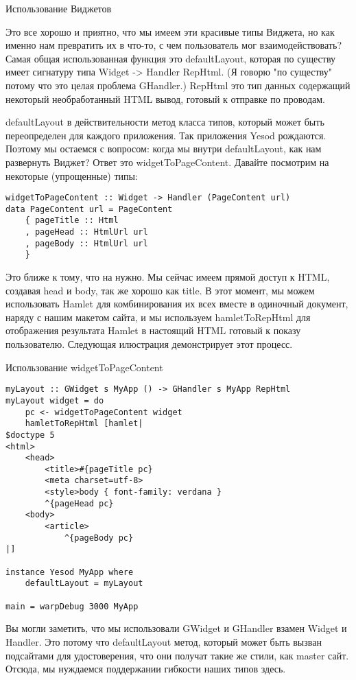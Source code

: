 Использование Виджетов

Это все хорошо и приятно, что мы имеем эти красивые типы Виджета, но как именно нам превратить их в что-то, с чем пользователь мог взаимодействовать? Самая общая использованная функция это defaultLayout, которая по существу имеет сигнатуру типа Widget -> Handler RepHtml. (Я говорю "по существу" потому что это целая проблема GHandler.) RepHtml это тип данных содержащий некоторый необработанный HTML вывод, готовый к отправке по проводам.

defaultLayout в действительности метод класса типов, который может быть переопределен для каждого приложения. Так приложения Yesod рождаются. Поэтому мы остаемся с вопросом: когда мы внутри defaultLayout, как нам развернуть Виджет? Ответ это widgetToPageContent. Давайте посмотрим на некоторые (упрощенные) типы: 

\begin{lstlisting}
widgetToPageContent :: Widget -> Handler (PageContent url)
data PageContent url = PageContent
    { pageTitle :: Html
    , pageHead :: HtmlUrl url
    , pageBody :: HtmlUrl url
    }
\end{lstlisting} 

Это ближе к тому, что на нужно. Мы сейчас имеем прямой доступ к HTML, создавая head и body, так же хорошо как title. В этот момент, мы можем использовать Hamlet для комбинирования их всех вместе в одиночный документ, наряду с нашим макетом сайта, и мы используем hamletToRepHtml для отображения результата Hamlet в настоящий HTML готовый к показу пользователю. Следующая илюстрация демонстрирует этот процесс.

Использование widgetToPageContent

\begin{lstlisting}
myLayout :: GWidget s MyApp () -> GHandler s MyApp RepHtml
myLayout widget = do
    pc <- widgetToPageContent widget
    hamletToRepHtml [hamlet|
$doctype 5
<html>
    <head>
        <title>#{pageTitle pc}
        <meta charset=utf-8>
        <style>body { font-family: verdana }
        ^{pageHead pc}
    <body>
        <article>
            ^{pageBody pc}
|]

instance Yesod MyApp where
    defaultLayout = myLayout

main = warpDebug 3000 MyApp
\end{lstlisting}

Вы могли заметить, что мы использовали GWidget и GHandler взамен Widget и Handler. Это потому что defaultLayout метод, который может быть вызван подсайтами для удостоверения, что они получат такие же стили, как master сайт. Отсюда, мы нуждаемся поддержании гибкости наших типов здесь.

